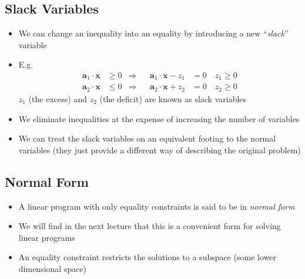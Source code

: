 \begin{slide}
\section[-2]{Slack Variables}

\begin{PauseHighLight}
  \begin{itemize}
  \item We can change an inequality into an equality by introducing a
    new ``\emph{slack}'' variable\pause
  \item E.g.
    \begin{align*}
      \bm{a}_1\cdot\bm{x} &\geq 0 &\Rightarrow& &
      \bm{a}_1\cdot\bm{x} - z_1 &=0 \quad z_1 \geq 0 \\ 
      \bm{a}_2\cdot\bm{x} &\leq 0 &\Rightarrow& &
      \bm{a}_2\cdot\bm{x} + z_2 &=0 \quad z_2 \geq 0
    \end{align*}
    $z_1$ (the excess) and $z_2$ (the deficit) are known as slack
    variables\pause
  \item We eliminate inequalities at the expense of increasing the
    number of variables\pause
  \item We can treat the slack variables on an equivalent footing to the
    normal variables (they just provide a different way of describing
    the original problem)\pause
  \end{itemize}
\end{PauseHighLight}

\end{slide}


\begin{slide}
\section{Normal Form}

\begin{PauseHighLight}
  \begin{itemize}
  \item A linear program with only equality constraints is said to be in
    \emph{normal form}\pause
  \item We will find in the next lecture that this is a convenient form
    for solving linear programs\pause
  \item An equality constraint restricts the solutions to a subspace
    (some lower dimensional space)\pause
  \end{itemize}
\end{PauseHighLight}

\end{slide}

